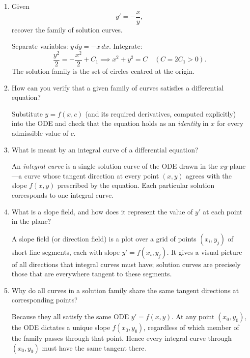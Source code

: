 \documentclass{self-check}
\begin{document}
\begin{enumerate}[leftmargin=*, itemsep=8pt]
  \item Given \[ y'=-\frac{x}{y}, \] recover the family of solution curves.

    \begin{answer} Separate variables: $y\,dy = -x\,dx$.  Integrate:
      \[
        \frac{y^2}{2} = -\frac{x^2}{2} + C_1 \implies x^2+y^2 = C \quad
        (C=2C_1>0).
      \]
      The solution family is the set of circles centred at the origin.
    \end{answer}

  \item How can you verify that a given family of curves satisfies a
    differential equation?

    \begin{answer} Substitute $y=f(x,c)$ (and its required
      derivatives, computed explicitly) into the ODE and check that the
      equation holds as an \emph{identity} in $x$ for every admissible
      value of $c$.
    \end{answer}

  \item What is meant by an integral curve of a differential equation?

    \begin{answer} An \emph{integral curve} is a single solution
      curve of the ODE drawn in the $xy$-plane---a curve whose tangent
      direction at every point $(x,y)$ agrees with the slope $f(x,y)$
      prescribed by the equation.  Each particular solution corresponds
      to one integral curve.
    \end{answer}

  \item What is a slope field, and how does it represent the value of
    $y'$ at each point in the plane?

    \begin{answer} A slope field (or direction field) is a plot
      over a grid of points $(x_i,y_j)$ of short line segments, each
      with slope $y'=f(x_i,y_j)$.  It gives a visual picture of all
      directions that integral curves must have; solution curves are
      precisely those that are everywhere tangent to these segments.
    \end{answer}

  \item Why do all curves in a solution family share the same tangent
    directions at corresponding points?

    \begin{answer} Because they all satisfy the same ODE
      $y'=f(x,y)$.  At any point $(x_0,y_0)$, the ODE dictates a unique
      slope $f(x_0,y_0)$, regardless of which member of the family
      passes through that point.  Hence every integral curve through
      $(x_0,y_0)$ must have the same tangent there.
    \end{answer}


\end{enumerate}
\end{document}
